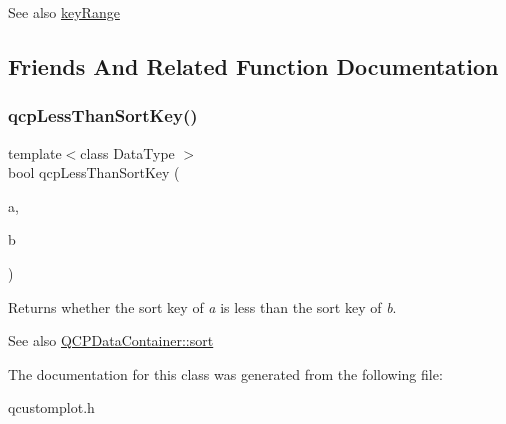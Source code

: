 \begin{DoxySeeAlso}{See also}
\hyperlink{classQCPDataContainer_aba6e1a93c21ccc56a432b4a02c9d0ed2}{key\+Range} 
\end{DoxySeeAlso}


\subsection{Friends And Related Function Documentation}
\mbox{\label{classQCPDataContainer_a74c5e06728cb6fa778a25d9ec0c4bd36}} 
\subsubsection{\texorpdfstring{qcp\+Less\+Than\+Sort\+Key()}{qcpLessThanSortKey()}}
{\footnotesize\ttfamily template$<$class Data\+Type $>$ \\
bool qcp\+Less\+Than\+Sort\+Key (\begin{DoxyParamCaption}\item[{const Data\+Type \&}]{a,  }\item[{const Data\+Type \&}]{b }\end{DoxyParamCaption})\hspace{0.3cm}{\ttfamily [related]}}

Returns whether the sort key of {\itshape a} is less than the sort key of {\itshape b}.

\begin{DoxySeeAlso}{See also}
\hyperlink{classQCPDataContainer_a75da92e33063b63d6da5014683591d45}{Q\+C\+P\+Data\+Container\+::sort} 
\end{DoxySeeAlso}


The documentation for this class was generated from the following file\+:\begin{DoxyCompactItemize}
\item 
qcustomplot.\+h\end{DoxyCompactItemize}
